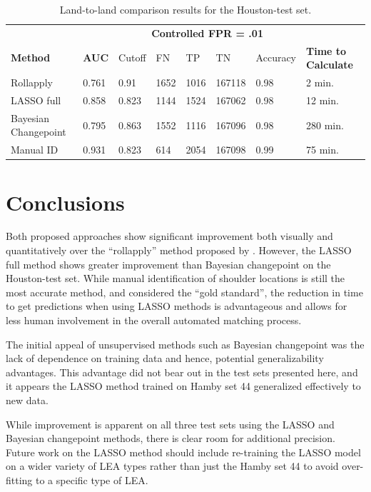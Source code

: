 \documentclass[12pt]{article}
\begin{document}
\begin{table}[]
\centering
\begin{tabular}{llllllll}
& & \multicolumn{5}{c}{\textbf{Controlled FPR = .01}} & \\
\textbf{Method} & \textbf{AUC} & Cutoff & FN &TP & TN & Accuracy & \textbf{Time to Calculate} \\ \hline
Rollapply & 0.761 &  0.91 & 1652 & 1016&167118 & 0.98 & 2 min. \\ \hline
LASSO full & 0.858 &  0.823 &1144 &1524 &167062 & 0.98 & 12 min. \\ \hline
Bayesian Changepoint & 0.795 &  0.863 &1552 & 1116&167096 & 0.98 & 280 min. \\ \hline
Manual ID & 0.931 &  0.823 & 614& 2054&167098 & 0.99 & 75 min. \\ \hline 
\end{tabular}
\caption{Land-to-land comparison results for the Houston-test set.}
\label{houston-table}
\end{table}

\section{Conclusions}

Both proposed approaches show significant improvement both visually and
quantitatively over the ``rollapply'' method proposed by \cite{Hare1}.
However, the LASSO full method shows greater improvement than Bayesian
changepoint on the Houston-test set. While manual identification of
shoulder locations is still the most accurate method, and considered the
``gold standard'', the reduction in time to get predictions when using
LASSO methods is advantageous and allows for less human involvement in
the overall automated matching process.

The initial appeal of unsupervised methods such as Bayesian changepoint
was the lack of dependence on training data and hence, potential
generalizability advantages. This advantage did not bear out in the test
sets presented here, and it appears the LASSO method trained on Hamby
set 44 generalized effectively to new data.

While improvement is apparent on all three test sets using the LASSO and
Bayesian changepoint methods, there is clear room for additional
precision. Future work on the LASSO method should include re-training
the LASSO model on a wider variety of LEA types rather than just the
Hamby set 44 to avoid over-fitting to a specific type of LEA.
\end{document}
